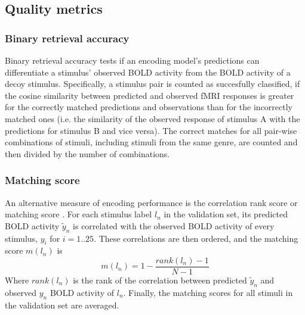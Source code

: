 \subsection*{Quality metrics} 

\subsubsection*{Binary retrieval accuracy}

Binary retrieval accuracy \citep{ML08} tests if an encoding model's predictions
can differentiate a stimulus' observed BOLD activity from the BOLD activity of
a decoy stimulus.  Specifically, a stimulus pair is counted as succesfully
classified, if the cosine similarity between predicted and observed f{MRI}
responses is greater for the correctly matched predictions and observations
than for the incorrectly matched ones (i.e. the similarity of the observed
response of stimulus A with the predictions for stimulus B and vice versa).
The correct matches for all pair-wise combinations of stimuli, including
stimuli from the same genre, are counted and then divided by the number of
combinations.

\subsubsection*{Matching score}
%
An alternative measure of encoding performance is the correlation rank score or
matching score \citep{SF14}. For each stimulus label $l_{n}$ in the validation
set, its predicted BOLD activity $\widetilde{y}_{n}$ is correlated with the
observed BOLD activity of every stimulus, $y_{i}$ for $i=1..25$. These
correlations are then ordered, and the  matching score $m(l_{n})$ is \[
m(l_{n}) = 1-\frac{rank(l_{n})-1}{N-1} \] Where $rank(l_{n})$ is the rank of
the correlation between predicted $\widetilde{y}_{n}$ and observed $y_{n}$ BOLD
activity of $l_{n}$. Finally, the matching scores for all stimuli in the
validation set are averaged.



